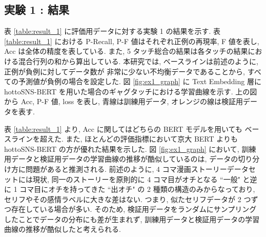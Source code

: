 \begin{table}[!h]
\vspace{10mm}
\caption{損失関数におけるクラス重み}
\label{table:ex_class_weight}
\centering
{}
\end{table}

\newpage
\changeindent{0cm}
\subsection{実験 1 : 結果}
\changeindent{2cm}

表 \ref{table:result_1} に評価用データに対する実験 1 の結果を示す. 表 \ref{table:result_1} における P-Recall, P-F 値はそれぞれ正例の再現率, F 値を表し, Acc は全体の精度を表している. また, 5 タッチ総合の結果は各タッチの結果における混合行列の和から算出している.
本研究では, ベースラインは前述のように, 正例が負例に対してデータ数が
非常に少ない不均衡データであることから, すべての予測値が負例の場合を設定した.
図 \ref{fig:ex1_graph} に Text Embedding 層に hottoSNS-BERT を用いた場合のギャグタッチにおける学習曲線を示す. 上の図から Acc, P-F 値, loss を表し, 青線は訓練用データ, オレンジの線は検証用データを表す.

表 \ref{table:result_1} より, Acc に関してはどちらの BERT モデルを用いても
ベースラインを超えた. また, ほとんどの評価指標において京大 BERT よりも hottoSNS-BERT の方が優れた結果を示した. 図 \ref{fig:ex1_graph} において, 訓練用データと検証用データの学習曲線の推移が酷似しているのは, データの切り分け方に問題があると推測される. 前述のように, 4 コマ漫画ストーリーデータセットには現状, 同一のストーリーを原則的に 4 コマ目がオチとなる ``一般" と逆に 1 コマ目にオチを持ってきた ``出オチ" の 2 種類の構造のみからなっており, セリフやその感情ラベルに大きな差はない. つまり, 似たセリフデータが 2 つずつ存在している場合が多い. そのため, 検証用データをランダムにサンプリングしたことでデータの分布にも差が生まれず, 訓練用データと検証用データの学習曲線の推移が酷似したと考えられる.

